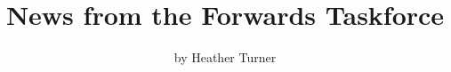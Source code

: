 \title{News from the Forwards Taskforce}
\author{by Heather Turner}

\maketitle





\address{%
Heather Turner\\
\\%
\\
%
%
%
%
}
